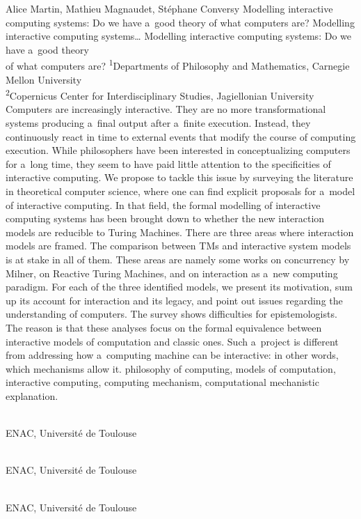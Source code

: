 \begin{artengenv2auth}{Alice Martin, Mathieu Magnaudet, Stéphane Conversy}
	{Modelling interactive computing systems: Do we have a~good theory of what computers are?}
	{Modelling interactive computing systems\ldots}
	{Modelling interactive computing systems: Do we have a~good theory\\of what computers are?}
	{\textsuperscript{1}Departments of Philosophy and Mathematics, Carnegie Mellon University\\
		\textsuperscript{2}Copernicus Center for Interdisciplinary Studies, Jagiellonian University}
	{Computers are increasingly interactive. They are no more transformational systems producing a~final output after a~finite execution. Instead, they continuously react in time to external events that modify the course of computing execution. While philosophers have been interested in conceptualizing computers for a~long time, they seem to have paid little attention to the specificities of interactive computing. We propose to tackle this issue by surveying the literature in theoretical computer science, where one can find explicit proposals for a~model of interactive computing. 
	In that field, the formal modelling of interactive computing systems has been brought down to whether the new interaction models are reducible to Turing Machines. There are three areas where interaction models are framed. The comparison between TMs and interactive system models is at stake in all of them. These areas are namely some works on concurrency by Milner, on Reactive Turing Machines, and on interaction as a~new computing paradigm. For each of the three identified models, we present its motivation, sum up its account for interaction and its legacy, and point out issues regarding the understanding of computers. The survey shows difficulties for epistemologists. The reason is that these analyses focus on the formal equivalence between interactive models of computation and classic ones. Such a~project is different from addressing how a~computing machine can be interactive: in other words, which mechanisms allow it.}
	{philosophy of computing, models of computation, interactive computing, computing mechanism, computational mechanistic explanation.}
	{%
		{\flushright{}\\\subsubsectit\small{ENAC, Université de Toulouse}\par}%
		{\flushright{}\\\subsubsectit\small{ENAC, Université de Toulouse}\par}%
		{\flushright{}\\\subsubsectit\small{ENAC, Université de Toulouse}\par}%
	}


\end{artengenv2auth}
